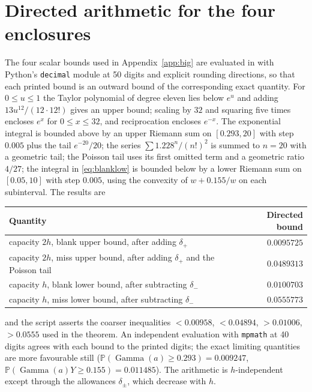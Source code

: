 \documentclass[11pt,a4paper]{article}
\theoremstyle{plain}
\theoremstyle{definition}
\theoremstyle{remark}
\newcommand{\Prob}{\mathbb P}
\DeclareMathOperator{\Gam}{Gamma}
\begin{document}
\section{Directed arithmetic for the four enclosures}\label{app:arith}
The four scalar bounds used in Appendix~\ref{app:big} are evaluated in  with Python's \texttt{decimal} module at 50 digits and explicit rounding directions, so that each printed bound is an outward bound of the corresponding exact quantity. For $0\le u\le1$ the Taylor polynomial of degree eleven lies below $e^u$ and adding $13u^{12}/(12\cdot12!)$ gives an upper bound; scaling by $32$ and squaring five times encloses $e^{x}$ for $0\le x\le32$, and reciprocation encloses $e^{-x}$. The exponential integral is bounded above by an upper Riemann sum on $[0.293,20]$ with step $0.005$ plus the tail $e^{-20}/20$; the series $\sum1.228^n/(n!)^2$ is summed to $n=20$ with a geometric tail; the Poisson tail uses its first omitted term and a geometric ratio $4/27$; the integral in \eqref{eq:blanklow} is bounded below by a lower Riemann sum on $[0.05,10]$ with step $0.005$, using the convexity of $w+0.155/w$ on each subinterval. The results are
\begin{center}\small
\begin{tabular}{lr}\toprule
Quantity & Directed bound\\\midrule
capacity $2h$, blank upper bound, after adding $\delta_+$ & $0.0095725$\\
capacity $2h$, miss upper bound, after adding $\delta_+$ and the Poisson tail & $0.0489313$\\
capacity $h$, blank lower bound, after subtracting $\delta_-$ & $0.0100703$\\
capacity $h$, miss lower bound, after subtracting $\delta_-$ & $0.0555773$\\\bottomrule
\end{tabular}
\end{center}
and the script asserts the coarser inequalities $<0.00958$, $<0.04894$, $>0.01006$, $>0.0555$ used in the theorem. An independent evaluation with \texttt{mpmath} at 40 digits agrees with each bound to the printed digits; the exact limiting quantities are more favourable still ($\Prob(\Gam(a)\ge0.293)=0.009247$, $\Prob(\Gam(a)Y\ge0.155)=0.011485$). The arithmetic is $h$-independent except through the allowances $\delta_\pm$, which decrease with $h$.
\end{document}
